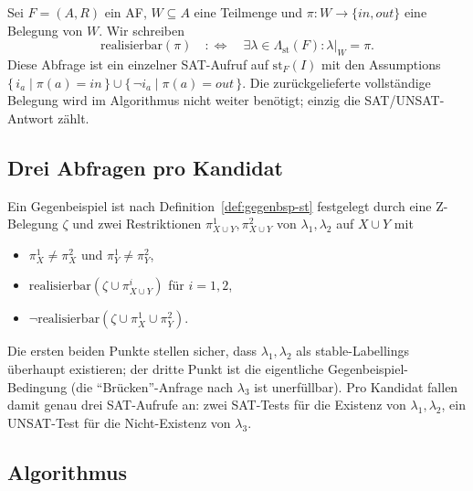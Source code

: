 Sei \(F=(A,R)\) ein AF, \(W\subseteq A\) eine Teilmenge und
\(\pi : W \to \{\mathit{in},\mathit{out}\}\) eine Belegung von \(W\).
Wir schreiben
\[
    \mathrm{realisierbar}(\pi)
    \quad:\Longleftrightarrow\quad
    \exists \lambda \in \varLambda_{\mathrm{st}}(F):
    \lambda|_W = \pi.
\]
Diese Abfrage ist ein einzelner SAT-Aufruf auf \(\mathrm{st}_F(I)\) mit
den Assumptions
\(\{\, i_a \mid \pi(a) = \mathit{in}\,\} \cup
\{\, \neg i_a \mid \pi(a) = \mathit{out}\,\}\).
Die zurückgelieferte vollständige Belegung wird im Algorithmus nicht
weiter benötigt; einzig die SAT/UNSAT-Antwort zählt.

\subsection{Drei Abfragen pro Kandidat}
\label{subsec:intra-scc-three-queries}

Ein Gegenbeispiel ist nach Definition~\ref{def:gegenbsp-st} festgelegt
durch eine Z-Belegung \(\zeta\) und zwei Restriktionen
\(\pi^1_{X\cup Y}, \pi^2_{X\cup Y}\) von \(\lambda_1, \lambda_2\) auf
\(X\cup Y\) mit
\begin{itemize}
    \item \(\pi^1_X \neq \pi^2_X\) und \(\pi^1_Y \neq \pi^2_Y\),
    \item \(\mathrm{realisierbar}(\zeta \cup \pi^i_{X\cup Y})\) für
          \(i=1,2\),
    \item \(\lnot\mathrm{realisierbar}(\zeta \cup \pi^1_X \cup \pi^2_Y)\).
\end{itemize}
Die ersten beiden Punkte stellen sicher, dass \(\lambda_1, \lambda_2\)
als stable-Labellings überhaupt existieren; der dritte Punkt ist die
eigentliche Gegenbeispiel-Bedingung (die ``Brücken''-Anfrage nach
\(\lambda_3\) ist unerfüllbar). Pro Kandidat fallen damit genau drei
SAT-Aufrufe an: zwei SAT-Tests für die Existenz von \(\lambda_1,
\lambda_2\), ein UNSAT-Test für die Nicht-Existenz von \(\lambda_3\).

\subsection{Algorithmus}
\label{subsec:intra-scc-algo}

